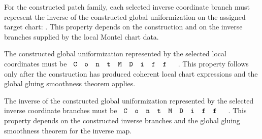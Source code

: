 \begin{lemma}
\label{lem:montel-selector-invcoord-represents-uniformization}
For the constructed patch family, each selected inverse coordinate branch must
represent the inverse of the constructed global uniformization on the assigned
target chart:
. This property
depends on the construction and on the inverse branches supplied by the local
Montel chart data.
\end{lemma}

\begin{lemma}
\label{lem:montel-selector-uniformization-contmdiff}
The constructed global uniformization represented by the selected local
coordinates must be \(\code{ContMDiff}\). This property follows only after the
construction has produced coherent local chart expressions and the global
gluing smoothness theorem applies.
\end{lemma}

\begin{lemma}
\label{lem:montel-selector-inverse-uniformization-contmdiff}
The inverse of the constructed global uniformization represented by the selected
inverse coordinate branches must be \(\code{ContMDiff}\). This property depends
on the constructed inverse branches and the global gluing smoothness theorem for
the inverse map.
\end{lemma}

